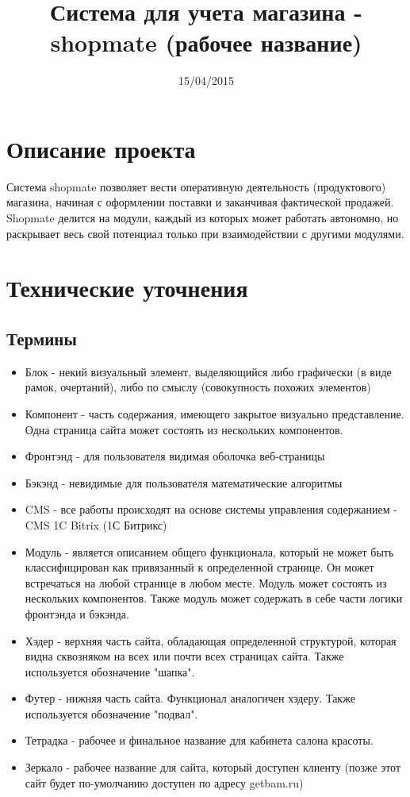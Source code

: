 \documentclass[DIV=calc, paper=a4, fontsize=11pt]{scrartcl} %
\title{Система для учета магазина - shopmate (рабочее название)}
\date{15/04/2015}
\begin{document}
\maketitle

\section{Описание проекта}
Система shopmate позволяет вести оперативную деятельность (продуктового) магазина, начиная с оформлении поставки и заканчивая фактической продажей. Shopmate делится на модули, каждый из которых может работать автономно, но раскрывает весь свой потенциал только при взаимодействии с другими модулями. 

\section{Технические уточнения}

\subsection{Термины}

        \begin{itemize}
        \item Блок - некий визуальный элемент, выделяющийся либо графически (в виде рамок, очертаний), либо по смыслу (совокупность похожих элементов)
        \item Компонент - часть содержания, имеющего закрытое визуально представление. Одна страница сайта может состоять из нескольких компонентов.
        \item Фронтэнд - для пользователя видимая оболочка веб-страницы
        \item Бэкэнд - невидимые для пользователя математические алгоритмы
        \item CMS - все работы происходят на основе системы управления содержанием - CMS 1C Bitrix (1С Битрикс)
        \item Модуль - является описанием общего функционала, который не может быть классифицирован как привязанный к определенной странице. Он может встречаться на любой странице в любом месте. Модуль может состоять из нескольких компонентов. Также модуль может содержать в себе части логики фронтэнда и бэкэнда.
        \item Хэдер - верхняя часть сайта, обладающая определенной структурой, которая видна сквозняком на всех или почти всех страницах сайта. Также используется обозначение "шапка".
        \item Футер - нижняя часть сайта. Функционал аналогичен хэдеру. Также используется обозначение "подвал".
        \item Тетрадка - рабочее и финальное название для кабинета салона красоты.
        \item Зеркало - рабочее название для сайта, который доступен клиенту (позже этот сайт будет по-умолчанию доступен по адресу getbam.ru)
    \end{itemize}
\end{document}
